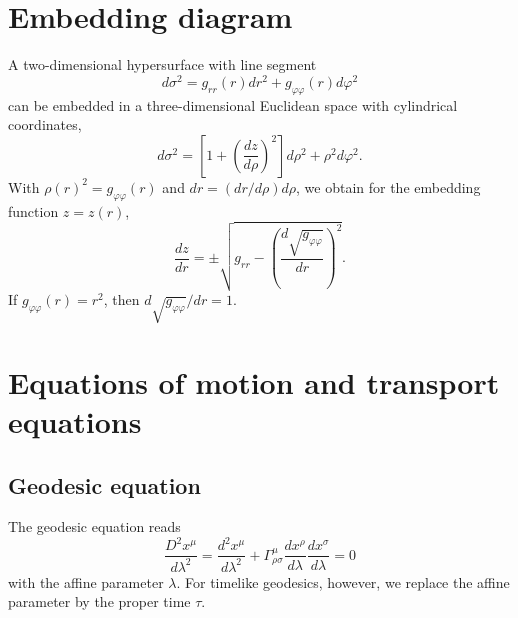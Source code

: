 \documentclass[10pt,twoside,notitlepage,a4paper,fleqn,openbib]{report}
\begin{document}
\section{Embedding diagram}\label{sec:embedding}
\setcounter{equation}{0}
A two-dimensional hypersurface with line segment
\begin{equation}
 d\sigma^2 = g_{rr}(r)dr^2+g_{\varphi\varphi}(r)d\varphi^2
\end{equation}
can be embedded in a three-dimensional Euclidean space with cylindrical coordinates,
\begin{equation}
 d\sigma^2 = \left[1+\left(\frac{dz}{d\rho}\right)^2\right]d\rho^2+\rho^2 d\varphi^2.
\end{equation}
With $\rho(r)^2=g_{\varphi\varphi}(r)$ and $dr=(dr/d\rho)d\rho$, we obtain for the embedding function $z=z(r)$,
\begin{equation}
 \frac{dz}{dr} = \pm\sqrt{g_{rr}-\left(\frac{d\sqrt{g_{\varphi\varphi}}}{dr}\right)^2}.
\end{equation}
If $g_{\varphi\varphi}(r)=r^2$, then $d\sqrt{g_{\varphi\varphi}}/dr = 1$.


\section{Equations of motion and transport equations}\label{sec:eqmotion}
\setcounter{equation}{0}

\subsection{Geodesic equation}
The geodesic equation reads
\begin{equation}
  \label{eq:geodEq}
  \frac{D^2x^{\mu}}{d\lambda^2} = \frac{d^2x^{\mu}}{d\lambda^2} + \Gamma_{\rho\sigma}^{\mu}\frac{dx^{\rho}}{d\lambda}\frac{dx^{\sigma}}{d\lambda} = 0
\end{equation}
with the affine parameter $\lambda$. For timelike geodesics, however, we replace the affine parameter by the proper time $\tau$.
\end{document}
